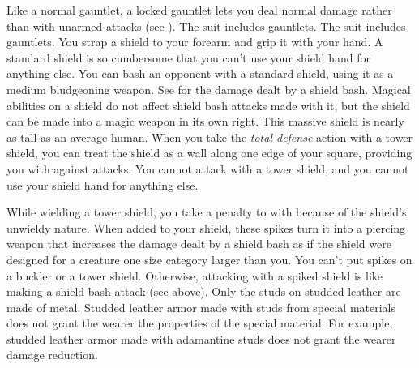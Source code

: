         Like a normal gauntlet, a locked gauntlet lets you deal normal damage rather than  with unarmed attacks (see ).
         The suit includes gauntlets.
         The suit includes gauntlets.
         You strap a shield to your forearm and grip it with your hand. A standard shield is so cumbersome that you can't use your shield hand for anything else.
         You can bash an opponent with a standard shield, using it as a medium bludgeoning weapon. See  for the damage dealt by a shield bash.
        Magical abilities on a shield do not affect shield bash attacks made with it, but the shield can be made into a magic weapon in its own right.
         This massive shield is nearly as tall as an average human.
        When you take the \textit{total defense} action with a tower shield, you can treat the shield as a wall along one edge of your square, providing you with  against attacks.
        You cannot attack with a tower shield, and you cannot use your shield hand for anything else.

        While wielding a tower shield, you take a  penalty to  with  because of the shield's unwieldy nature.
         When added to your shield, these spikes turn it into a piercing weapon that increases the damage dealt by a shield bash as if the shield were designed for a creature one size category larger than you. You can't put spikes on a buckler or a tower shield. Otherwise, attacking with a spiked shield is like making a shield bash attack (see above).
         Only the studs on studded leather are made of metal.
        Studded leather armor made with studs from special materials does not grant the wearer the properties of the special material.
        For example, studded leather armor made with adamantine studs does not grant the wearer damage reduction.

